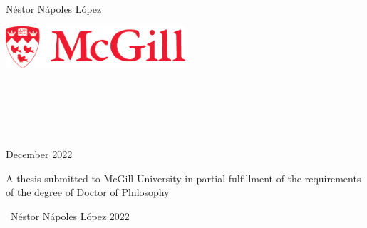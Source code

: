 \begin{titlepage}
\begin{center}

    \huge
    \textbf{}

    \vspace{1cm}

    \LARGE N\'estor N\'apoles L\'opez

    \vspace{1cm}

    \includegraphics[width=0.5\textwidth]{frontmatter/figures/mcgill}

    \vspace{0.5cm}

    \large
     \\
     \\
     \\
     \\

    \vfill

    December 2022

    \vspace{2cm}

    A thesis submitted to McGill University in partial
    fulfillment of the requirements of the degree of Doctor
    of Philosophy

    \vspace{1cm}

    \textcopyright \ N\'estor N\'apoles L\'opez 2022

\end{center}
\end{titlepage}
